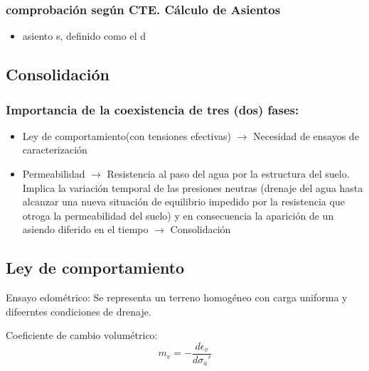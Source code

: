 \subsubsection{comprobación según CTE. Cálculo de Asientos}
\begin{itemize}
    \item asiento s, definido como el d
\end{itemize}

\subsection{Consolidación}
\subsubsection{Importancia de la coexistencia de tres (dos) fases:}
\begin{itemize}
    \item Ley  de comportamiento(con tensiones efectivas) $\rightarrow$ Necesidad de ensayos de caracterización
    \item Permeabilidad $\rightarrow$ Resistencia al paso del agua por la estructura del suelo. Implica la variación temporal de las presiones neutras (drenaje del agua hasta alcanzar una nueva situación de equilibrio impedido por la resistencia que otroga la permeabilidad del suelo) y en consecuencia la aparición de un asiendo diferido en el tiempo $\rightarrow$ Consolidación
\end{itemize}

\subsection{Ley de comportamiento}
Ensayo edométrico: Se representa un terreno homogéneo con carga uniforma y difeerntes condiciones de drenaje.

Coeficiente de cambio volumétrico:
\[m_v = - \frac{d \epsilon_v}{d \sigma_a'}\]

